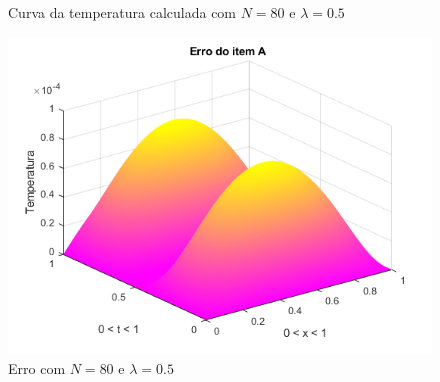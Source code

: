 \documentclass[12pt]{article}
\begin{document}
\begin{spacing}{1.5}
\begin{figure}
    \caption{Curva da temperatura calculada com $N=80$ e $\lambda=0.5$}
    \label{fig:A_n80lambda0-5_calc}
\end{figure}
\begin{figure}
    \centering
    \includegraphics[width=0.8\linewidth]{Primeira_Tarefa/ItemA/n80_lambda0-5_erro.png}
    \caption{Erro com $N=80$ e $\lambda=0.5$}
    \label{fig:A_n80lambda0-5_erro}
\end{figure}



\end{spacing}
\end{document}
